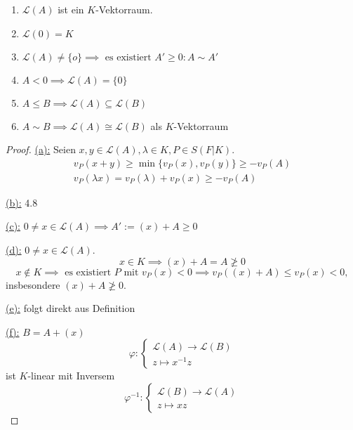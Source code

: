 \begin{lemma}
    \begin{enumerate}
        \item $\mathcal{L}(A)$ ist ein $K$-Vektorraum.
        \item $\mathcal{L}(0) = K$
        \item $\mathcal{L}(A) \ne \{o\} \implies \text{ es existiert } A'\geq 0: A \sim A'$
        \item $ A < 0 \implies \mathcal{L}(A) = \{0\}$
        \item $A \leq B \implies \mathcal{L}(A) \subseteq \mathcal{L}(B)$
        \item $A \sim B \implies \mathcal{L}(A) \cong \mathcal{L}(B)$ als $K$-Vektorraum
    \end{enumerate}
\end{lemma}
\begin{proof}
    \underline{(a):} Seien $x,y \in \mathcal{L}(A), \lambda \in K, P \in S(F|K)$.
    \begin{align*}
        v_P(x + y) \geq \min\{v_P(x), v_P(y)\} \geq - v_P(A)\\
        v_P(\lambda x) = v_P(\lambda) + v_P(x) \geq - v_P(A)
    \end{align*}

    \underline{(b):} 4.8

    \underline{(c):} $0 \ne x \in \mathcal{L}(A) \implies A' := (x) + A \geq 0$

    \underline{(d):} $0 \ne x \in \mathcal{L}(A)$. 
    $$x \in K \implies (x) + A = A \not \geq 0$$
    $$ x \notin K \implies \text{ es existiert } P \text{ mit } v_P(x) < 0 \implies v_P((x) + A) \leq v_P(x) < 0,$$
    insbesondere $(x) + A \not \geq 0$.

    \underline{(e):} folgt direkt aus Definition

    \underline{(f):} $B=A+(x)$ $$ \varphi: \begin{cases}
        \mathcal{L}(A) \to \mathcal{L}(B)\\
        z \mapsto x^{-1}z
    \end{cases}$$
    ist $K$-linear mit Inversem
    $$ \varphi^{-1}: \begin{cases}
        \mathcal{L}(B) \to \mathcal{L}(A)\\
        z \mapsto xz
    \end{cases}$$
\end{proof}

